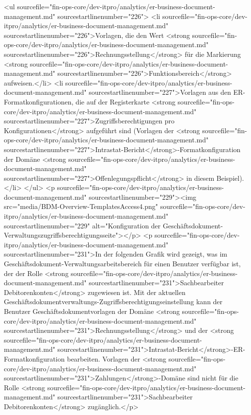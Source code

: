 <ul sourcefile="fin-ops-core/dev-itpro/analytics/er-business-document-management.md" sourcestartlinenumber="226">
<li sourcefile="fin-ops-core/dev-itpro/analytics/er-business-document-management.md" sourcestartlinenumber="226">Vorlagen, die den Wert <strong sourcefile="fin-ops-core/dev-itpro/analytics/er-business-document-management.md" sourcestartlinenumber="226">Rechnungsstellung</strong> für die Markierung <strong sourcefile="fin-ops-core/dev-itpro/analytics/er-business-document-management.md" sourcestartlinenumber="226">Funktionsbereich</strong> aufweisen.</li>
<li sourcefile="fin-ops-core/dev-itpro/analytics/er-business-document-management.md" sourcestartlinenumber="227">Vorlagen aus den ER-Formatkonfigurationen, die auf der Registerkarte <strong sourcefile="fin-ops-core/dev-itpro/analytics/er-business-document-management.md" sourcestartlinenumber="227">Zugriffsberechtigungen pro Konfigurationen</strong> aufgeführt sind (Vorlagen der <strong sourcefile="fin-ops-core/dev-itpro/analytics/er-business-document-management.md" sourcestartlinenumber="227">Intrastat-Bericht</strong>-Formatkonfiguration der Domäne <strong sourcefile="fin-ops-core/dev-itpro/analytics/er-business-document-management.md" sourcestartlinenumber="227">Offenlegungspflicht</strong> in diesem Beispiel).</li>
</ul>
<p sourcefile="fin-ops-core/dev-itpro/analytics/er-business-document-management.md" sourcestartlinenumber="229"><img src="media/BDM-Overview-TemplatesAccess4.png" sourcefile="fin-ops-core/dev-itpro/analytics/er-business-document-management.md" sourcestartlinenumber="229" alt="Konfiguration der Geschäftsdokument-Verwaltungszugriffsberechtigungsseite"></p>
<p sourcefile="fin-ops-core/dev-itpro/analytics/er-business-document-management.md" sourcestartlinenumber="231">In der folgenden Grafik wird gezeigt, was im Geschäftsdokument-Verwaltungsarbeitsbereich für einen Benutzer verfügbar ist, der der Rolle <strong sourcefile="fin-ops-core/dev-itpro/analytics/er-business-document-management.md" sourcestartlinenumber="231">Sachbearbeiter Debitorenkonten</strong> zugewiesen ist. Mit der aktuellen Geschäftsdokumentverwaltungs-Zugriffsberechtigungseinstellung kann der Benutzer Geschäftsdokumentvorlagen der Domäne <strong sourcefile="fin-ops-core/dev-itpro/analytics/er-business-document-management.md" sourcestartlinenumber="231">Rechnungsstellung</strong> und der <strong sourcefile="fin-ops-core/dev-itpro/analytics/er-business-document-management.md" sourcestartlinenumber="231">Intrastat-Bericht</strong>-ER-Formatkonfiguration bearbeiten. Vorlagen der <strong sourcefile="fin-ops-core/dev-itpro/analytics/er-business-document-management.md" sourcestartlinenumber="231">Zahlungen</strong>-Domäne sind nicht für die Rolle <strong sourcefile="fin-ops-core/dev-itpro/analytics/er-business-document-management.md" sourcestartlinenumber="231">Sachbearbeiter Debitorenkonten</strong> zugänglich.</p>
